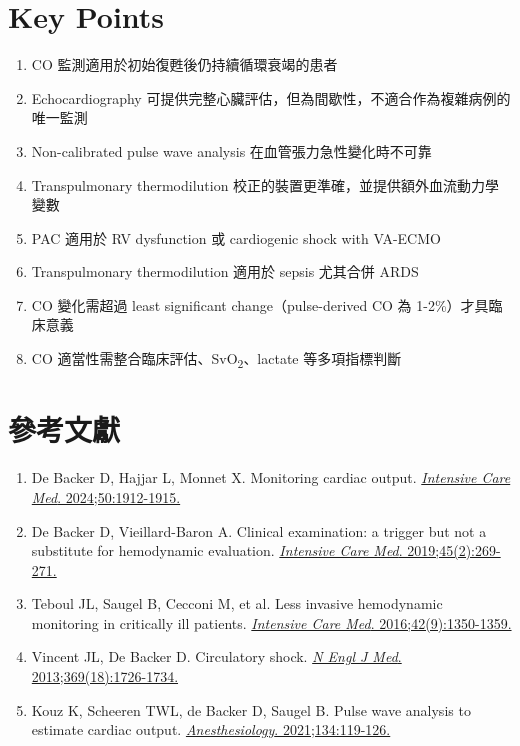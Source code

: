 \documentclass[11pt,a4paper]{article}
\begin{document}
\section{Key Points}

\begin{enumerate}
    \item CO 監測適用於初始復甦後仍持續循環衰竭的患者
    \item Echocardiography 可提供完整心臟評估，但為間歇性，不適合作為複雜病例的唯一監測
    \item Non-calibrated pulse wave analysis 在血管張力急性變化時不可靠
    \item Transpulmonary thermodilution 校正的裝置更準確，並提供額外血流動力學變數
    \item PAC 適用於 RV dysfunction 或 cardiogenic shock with VA-ECMO
    \item Transpulmonary thermodilution 適用於 sepsis 尤其合併 ARDS
    \item CO 變化需超過 least significant change（pulse-derived CO 為 1-2\%）才具臨床意義
    \item CO 適當性需整合臨床評估、SvO\textsubscript{2}、lactate 等多項指標判斷
\end{enumerate}

\section{參考文獻}

\begin{enumerate}
    \item De Backer D, Hajjar L, Monnet X. Monitoring cardiac output. \href{https://doi.org/10.1007/s00134-024-07566-6}{\textit{Intensive Care Med}. 2024;50:1912-1915.}

    \item De Backer D, Vieillard-Baron A. Clinical examination: a trigger but not a substitute for hemodynamic evaluation. \href{https://doi.org/10.1007/s00134-018-5489-y}{\textit{Intensive Care Med}. 2019;45(2):269-271.}

    \item Teboul JL, Saugel B, Cecconi M, et al. Less invasive hemodynamic monitoring in critically ill patients. \href{https://doi.org/10.1007/s00134-016-4375-7}{\textit{Intensive Care Med}. 2016;42(9):1350-1359.}

    \item Vincent JL, De Backer D. Circulatory shock. \href{https://doi.org/10.1056/NEJMra1208943}{\textit{N Engl J Med}. 2013;369(18):1726-1734.}

    \item Kouz K, Scheeren TWL, de Backer D, Saugel B. Pulse wave analysis to estimate cardiac output. \href{https://doi.org/10.1097/ALN.0000000000003553}{\textit{Anesthesiology}. 2021;134:119-126.}
\end{enumerate}
\end{document}
